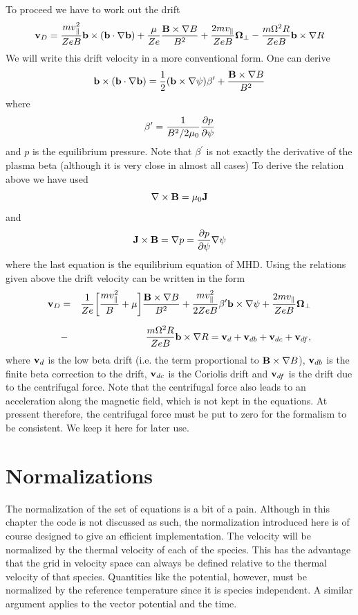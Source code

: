 \documentclass{report}
\def\be{\begin{equation}}
\def\ee{\end{equation}}
\def\bee{\begin{eqnarray}}
\def\eee{\end{eqnarray}}
\begin{document}
To proceed we have to work out the drift 
\be 
{\bf v}_D = {m v_\parallel^2 \over Z e B} {\bf b} \times ({\bf b}\cdot \nabla {\bf b}) + 
{\mu \over Z e} {{\bf B}\times \nabla B \over B^2} + { 2 m v_\parallel \over Z e B } {\bf 
\Omega}_\perp - {m \Omega^2 R \over Z e B }  {\bf b} \times {\nabla R}
\ee 
We will write this drift velocity in a more conventional form. One can derive 
\be 
 {\bf b} \times ({\bf b}\cdot \nabla {\bf b}) =  {1\over 2} ({\bf b} \times \nabla \psi) 
\beta^\prime + {{\bf B}\times \nabla B \over B^2} 
\ee
where 
\be 
\beta^\prime = {1 \over B^2 / 2 \mu_0} {\partial p \over \partial \psi} 
\ee
and $p$ is the equilibrium pressure. Note that $\beta^\prime$ is not exactly the derivative 
of the plasma beta (although it is very close in almost all cases) 
To derive the relation above we have used 
\be 
\nabla \times {\bf B} = \mu_0 {\bf J} 
\ee 
and 
\be 
{\bf J} \times {\bf B} = \nabla p = {\partial p \over \partial \psi} \nabla \psi
\ee
where the last equation is the equilibrium equation of MHD. 
Using the relations given above the drift velocity can be written in the form 
\bee
\label{drift}
\index{drifts}
{\bf v}_D &=& {1\over Ze} \biggl [ {m v_\parallel^2\over B} + \mu \biggr ] {{\bf B} \times \nabla B
\over B^2} + {m v_\parallel^2 \over 2 Z e B} \beta^\prime {\bf b} \times \nabla \psi 
 + { 2 m v_\parallel \over Z e B } {\bf \Omega}_\perp \cr 
\noalign{\vskip 0.2 truecm} 
&-& {m \Omega^2 R \over Z e B }  {\bf b} \times {\nabla R} = {\bf v}_d + {\bf v}_{db} + {\bf v}_{dc} 
+ {\bf v}_{df}, 
\eee
where ${\bf v}_d$ is the low beta drift (i.e. the term proportional to ${\bf B} \times \nabla B$), 
${\bf v}_{db}$ is the finite beta correction to the drift, ${\bf v}_{dc}$ is the Coriolis drift
and ${\bf v}_{df}$ is the drift due to the centrifugal force. Note that the centrifugal force also
leads to an acceleration along the magnetic field, which is not kept in the equations. At pressent
therefore, the centrifugal force must be put to zero for the formalism to be consistent. We keep 
it here for later use.  



  
\section{Normalizations} 
\label{normalization}

The normalization of the set of equations is a bit of a pain. Although in this chapter the code is 
not discussed as such, the normalization introduced here is of course designed to give an efficient
implementation. 
The velocity will be normalized by the thermal velocity of each of the species. This has the 
advantage that the grid in velocity space can always be defined relative to the thermal 
velocity of that species. Quantities like the potential, however, must be normalized by 
the reference temperature since it is species independent. A similar argument applies 
to the vector potential and the time. 
\end{document}
